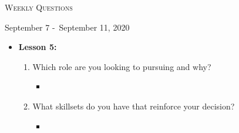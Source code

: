 \centerline{\LARGE\textsc{Weekly Questions}}
\centerline{September 7 -\ September 11, 2020}
\textbf{}
\begin{itemize}
  \item[] \textbf{\large Lesson 5:}
  \begin{enumerate}
    \item Which role are you looking to pursuing and why?
    \begin{itemize}
      \item 
    \end{itemize}
    \item What skillsets do you have that reinforce your decision?
    \begin{itemize}
      \item 
    \end{itemize}
  \end{enumerate}
\end{itemize}